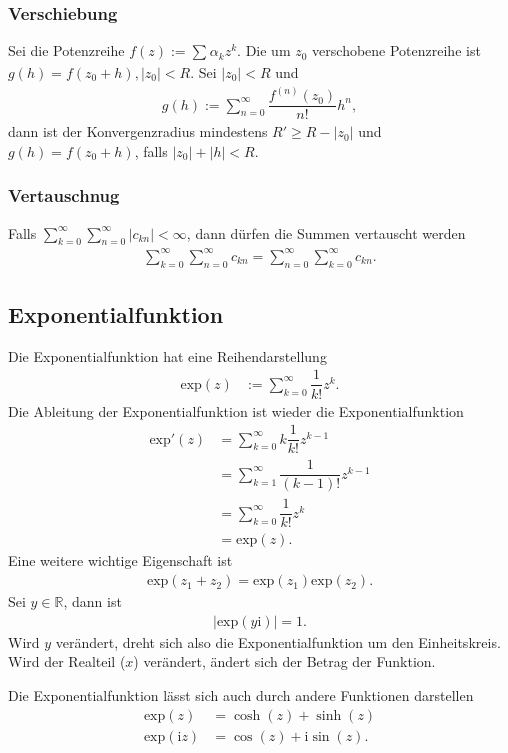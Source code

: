 \documentclass[a4paper,12pt]{article}
\numberwithin{equation}{section}
\begin{document}
\subsubsection{Verschiebung}
Sei die Potenzreihe $f\left(z\right):=\sum_{}^{}\alpha _kz^k$. Die um $z_0$ verschobene Potenzreihe ist $g\left(h\right)=f\left(z_0+h\right),|z_0|<R$. Sei $|z_0|<R$ und 
\begin{align} 
        g\left(h\right):=\sum_{n=0}^{\infty}\dfrac{f^{\left(n\right)}\left(z_0\right)}{n!}h^n
,\end{align} 
dann ist der Konvergenzradius mindestens $R'\geq R-|z_0|$ und $g\left(h\right)=f\left(z_0+h\right)$, falls $|z_0|+|h|<R$.

\subsubsection{Vertauschnug}
Falls $\sum_{k=0}^{\infty}\sum_{n=0}^{\infty}|c _{kn}|<\infty$, dann dürfen die Summen vertauscht werden
\begin{align} 
        \sum_{k=0}^{\infty}\sum_{n=0}^{\infty}c _{kn}=\sum_{n=0}^{\infty}\sum_{k=0}^{\infty}c _{kn}
.\end{align} 

\subsection{Exponentialfunktion}
Die Exponentialfunktion hat eine Reihendarstellung
\begin{align} 
        \text{exp}\left(z\right)&:=\sum_{k=0}^{\infty}\dfrac{1}{k!}z^k
.\end{align} 
Die Ableitung der Exponentialfunktion ist wieder die Exponentialfunktion
\begin{align} 
        \text{exp}'\left(z\right)&=\sum_{k=0}^{\infty}k\dfrac{1}{k!}z^{k-1}\\
                                     &=\sum_{k=1}^{\infty}\dfrac{1}{\left(k-1\right)!}z^{k-1}\\
                                     &=\sum_{k=0}^{\infty}\dfrac{1}{k!}z^k\\
                                     &=\text{exp}\left(z\right)
.\end{align} 
Eine weitere wichtige Eigenschaft ist 
\begin{align} 
        \text{exp}\left(z_1+z_2\right)=\text{exp}\left(z_1\right)\text{exp}\left(z_2\right)
.\end{align} 
Sei $y \in \mathbb{R}$, dann ist
\begin{align} 
        |\text{exp}\left(y\text{i}\right)|=1
.\end{align} 
Wird $y$ verändert, dreht sich also die Exponentialfunktion um den Einheitskreis. Wird der Realteil ($x$) verändert, ändert sich der Betrag der Funktion.\par
Die Exponentialfunktion lässt sich auch durch andere Funktionen darstellen
\begin{align} 
        \text{exp}\left(z\right)&=\cosh \left(z\right)+\sinh \left(z\right)\\
        \text{exp}\left(\text{i}z\right)&=\cos \left(z\right)+\text{i}\sin \left(z\right)
.\end{align} 

\end{document}
